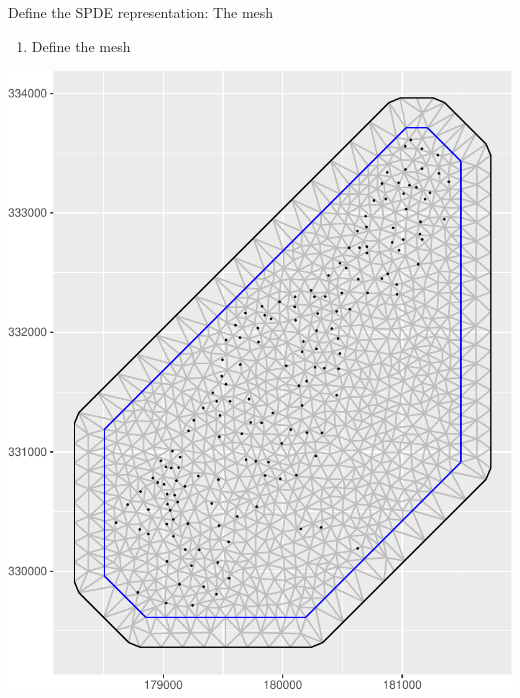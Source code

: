 \documentclass[
  ignorenonframetext,
]{beamer}
\newenvironment{Shaded}{\begin{snugshade}}{\end{snugshade}}
\newcommand{\AttributeTok}[1]{\textcolor[rgb]{0.77,0.63,0.00}{#1}}
\newcommand{\DecValTok}[1]{\textcolor[rgb]{0.00,0.00,0.81}{#1}}
\newcommand{\FunctionTok}[1]{\textcolor[rgb]{0.00,0.00,0.00}{#1}}
\newcommand{\NormalTok}[1]{#1}
\newcommand{\OtherTok}[1]{\textcolor[rgb]{0.56,0.35,0.01}{#1}}
\newcommand{\SpecialCharTok}[1]{\textcolor[rgb]{0.00,0.00,0.00}{#1}}
\providecommand{\tightlist}{%
  \setlength{\itemsep}{0pt}\setlength{\parskip}{0pt}}
\begin{document}
\begin{frame}[fragile]{Define the SPDE representation: The mesh}
\protect\hypertarget{define-the-spde-representation-the-mesh}{}
\begin{enumerate}
\tightlist
\item
  Define the mesh \small
\end{enumerate}

\begin{Shaded}
\end{Shaded}

\begin{center}\includegraphics[width=0.4\linewidth]{Part3_advanced_files/figure-beamer/unnamed-chunk-11-1} \end{center}
\normalsize
\end{frame}
\end{document}
